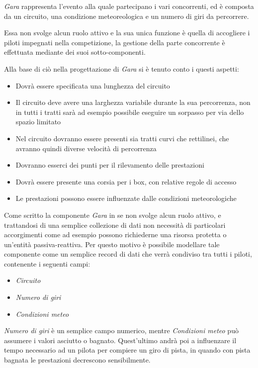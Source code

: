 \documentclass[a4paper,11pt, twoside]{book}
\begin{document}
      \textsl{Gara} rappresenta l'evento alla quale partecipano i vari concorrenti, ed è composta
      da un circuito, una condizione meteoreologica e un numero di giri da percorrere.
      
      Essa non svolge alcun ruolo attivo
      e la sua unica funzione è quella di accogliere i piloti impegnati nella competizione,
      la gestione della parte concorrente è effettuata mediante dei suoi sotto-componenti. 
      
      Alla base di ciò nella progettazione di \textsl{Gara} si è tenuto conto i questi aspetti:
	
	\begin{itemize}
	  \item Dovrà essere specificata una lunghezza del circuito
	  \item Il circuito deve avere una larghezza variabile durante la sua percorrenza, non in tutti i tratti sarà
		ad esempio possibile eseguire un sorpasso per via dello spazio limitato
	  \item Nel circuito dovranno essere presenti sia tratti curvi che rettilinei, che avranno quindi diverse velocità
		di percorrenza
	  \item Dovranno esserci dei punti per il rilevamento delle prestazioni
	  \item Dovrà essere presente una corsia per i box, con relative regole di accesso
	  \item Le prestazioni possono essere influenzate dalle condizioni meteorologiche
	\end{itemize}
	
      Come scritto la componente \textsl{Gara} in se non svolge alcun ruolo attivo, e trattandosi di una semplice
      collezione di dati non necessità di particolari accorgimenti come ad esempio possono richiederne una risorsa protetta
      o un'entità passiva-reattiva. Per questo motivo è possibile modellare tale componente come un semplice record di dati 
      che verrà condiviso tra tutti i piloti, contenente i seguenti campi:
      
      \begin{itemize}
	\item \textsl{Circuito}
	\item \textsl{Numero di giri}
	\item \textsl{Condizioni meteo}
      \end{itemize}
      
      \textsl{Numero di giri} è un semplice campo numerico, mentre \textsl{Condizioni meteo} può assumere i 
      valori asciutto o bagnato. Quest'ultimo andrà poi a influenzare il tempo necessario ad un pilota per compiere 
      un giro di pista, in quando con pista bagnata le prestazioni decrescono sensibilmente.
      
\end{document}
